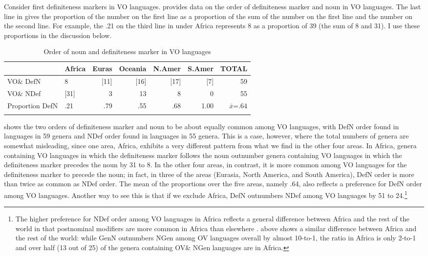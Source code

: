 \documentclass[output=paper]{langsci/langscibook}
\begin{document}
Consider first definiteness markers in VO languages.  provides data on the order of definiteness marker and noun in VO languages. The last line in  gives the proportion of the number on the first line as a proportion of the sum of the number on the first line and the number on the second line. For example, the .21 on the third line in  under Africa represents 8 as a proportion of 39 (the sum of 8 and 31). I use these proportions in the discussion below.

\begin{table}
\begin{tabularx}{\textwidth}{llrrrrr} 
\lsptoprule
& \bfseries Africa & \bfseries Euras & \bfseries Oceania & \bfseries N.Amer & \bfseries S.Amer & \bfseries TOTAL\\
\midrule
VO\& DefN & 8 & [11] & [16] & [17] & [7] & 59\\
VO\& NDef & [31] & 3 & 13 & 8 & 0 & 55\\
Proportion DefN & .21 & .79 & .55 & .68 & 1.00 & $\bar{x}$=.64\\
\lspbottomrule
\end{tabularx}
\caption{\label{tab:dryer:8}Order of noun and definiteness marker in VO languages} 
\end{table}

 shows the two orders of definiteness marker and noun to be about equally common among VO languages, with DefN order found in languages in 59 genera and NDef order found in languages in 55 genera. This is a case, however, where the total numbers of genera are somewhat misleading, since one area, Africa, exhibits a very different pattern from what we find in the other four areas. In Africa, genera containing VO languages in which the definiteness marker follows the noun outnumber genera containing VO languages in which the definiteness marker precedes the noun by 31 to 8. In the other four areas, in contrast, it is more common among VO languages for the definiteness marker to precede the noun; in fact, in three of the areas (Eurasia, North America, and South America), DefN order is more than twice as common as NDef order. The mean of the proportions over the five areas, namely .64, also reflects a preference for DefN order among VO languages. Another way to see this is that if we exclude Africa, DefN outnumbers NDef among VO languages by 51 to 24.\footnote{The higher preference for NDef order among VO languages in Africa reflects a general difference between Africa and the rest of the world in that postnominal modifiers are more common in Africa than elsewhere \citep{Dryer2010}.  above shows a similar difference between Africa and the rest of the world: while GenN outnumbers NGen among OV languages overall by almost 10-to-1, the ratio in Africa is only 2-to-1 and over half (13 out of 25) of the genera containing OV\& NGen languages are in Africa.}
\end{document}
